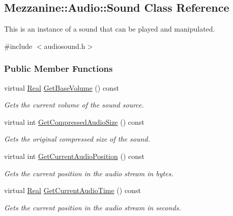 \hypertarget{classMezzanine_1_1Audio_1_1Sound}{
\subsection{Mezzanine::Audio::Sound Class Reference}
\label{classMezzanine_1_1Audio_1_1Sound}
}


This is an instance of a sound that can be played and manipulated.  




{\ttfamily \#include $<$audiosound.h$>$}

\subsubsection*{Public Member Functions}
\begin{DoxyCompactItemize}
\item 
virtual \hyperlink{namespaceMezzanine_a726731b1a7df72bf3583e4a97282c6f6}{Real} \hyperlink{classMezzanine_1_1Audio_1_1Sound_a59858396263b2f14fa937ff7c10011d7}{GetBaseVolume} () const 
\begin{DoxyCompactList}\small\item\em Gets the current volume of the sound source. \item\end{DoxyCompactList}\item 
virtual int \hyperlink{classMezzanine_1_1Audio_1_1Sound_ac6a79c5326a7a36b39f86604b62ccf98}{GetCompressedAudioSize} () const 
\begin{DoxyCompactList}\small\item\em Gets the original compressed size of the sound. \item\end{DoxyCompactList}\item 
virtual int \hyperlink{classMezzanine_1_1Audio_1_1Sound_abba56b18b9bb7b65cc712b4093e87ab5}{GetCurrentAudioPosition} () const 
\begin{DoxyCompactList}\small\item\em Gets the current position in the audio stream in bytes. \item\end{DoxyCompactList}\item 
virtual \hyperlink{namespaceMezzanine_a726731b1a7df72bf3583e4a97282c6f6}{Real} \hyperlink{classMezzanine_1_1Audio_1_1Sound_ad5ddf0b36c1ca5222a12dd64fa38e0ae}{GetCurrentAudioTime} () const 
\begin{DoxyCompactList}\small\item\em Gets the current position in the audio stream in seconds. \item\end{DoxyCompactList}\item 

\end{DoxyCompactItemize}
